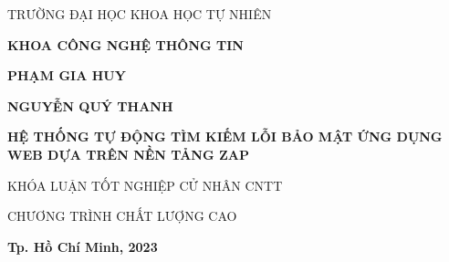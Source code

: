 \begin{center}

    \large TRƯỜNG ĐẠI HỌC KHOA HỌC TỰ NHIÊN 
    
    \textbf{\large KHOA CÔNG NGHỆ THÔNG TIN }
    
    \vspace{2.5cm}
    
    \textbf{\large PHẠM GIA HUY}
    
    \textbf{\large NGUYỄN QUÝ THANH}
    
    \vspace{3cm}
    
    \textbf{\LARGE HỆ THỐNG TỰ ĐỘNG TÌM KIẾM LỖI BẢO MẬT ỨNG DỤNG WEB DỰA TRÊN NỀN TẢNG ZAP }
    
    \vspace{3cm}
    
    \large KHÓA LUẬN TỐT NGHIỆP CỬ NHÂN CNTT

    \large CHƯƠNG TRÌNH CHẤT LƯỢNG CAO
    
    \vspace{4cm}
    
    \textbf{\large Tp. Hồ Chí Minh, 2023 }
\end{center}


    

    